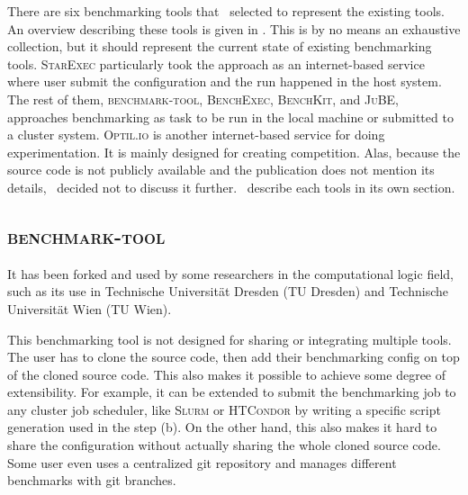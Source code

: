 There are six benchmarking tools that \first~selected to represent the existing tools.
An overview describing these tools is given in .
This is by no means an exhaustive collection, but it should represent the current state of existing benchmarking tools.
\textsc{StarExec} particularly took the approach as an internet-based service where user submit the configuration and the run happened in the host system.
The rest of them, \textsc{benchmark-tool}, \textsc{BenchExec}, \textsc{BenchKit}, and \textsc{JuBE}, approaches benchmarking as task to be run in the local machine or submitted to a cluster system.
\textsc{Optil.io} \citep{wasikOptilIoCloud2016a} is another internet-based service for doing experimentation.
It is mainly designed for creating competition.
Alas, because the source code is not publicly available and the publication does not mention its details, \first~decided not to discuss it further.
\First~describe each tools in its own section.

\subsection{\textsc{benchmark-tool}}

It has been forked and used by some researchers in the computational logic field, such as its use in Technische Universit\"at Dresden (TU Dresden) and Technische Universit\"at Wien (TU Wien).


This benchmarking tool is not designed for sharing or integrating multiple tools.
The user has to clone the source code, then add their benchmarking config on top of the cloned source code.
This also makes it possible to achieve some degree of extensibility.
For example, it can be extended to submit the benchmarking job to any cluster job scheduler, like \textsc{Slurm} \citep{yoo2003slurm} or \textsc{HTCondor} \citep{condor-practice} by writing a specific script generation used in the step (b).
On the other hand, this also makes it hard to share the configuration without actually sharing the whole cloned source code.
Some user even uses a centralized git repository and manages different benchmarks with git branches.

